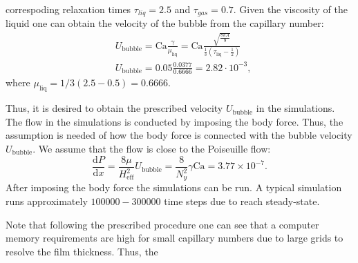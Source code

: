 \documentclass[preprint,12pt]{elsarticle}
\newcommand{\Ca}{\mathrm{Ca}}
\begin{document}
{\begin{description}
correspoding relaxation times $\tau_{liq}=2.5$ and $\tau_{gas}=0.7$. Given the viscosity of the
liquid one can obtain the velocity of the bubble from the capillary number: 
\begin{equation}
\begin{aligned}
&U_{\mathrm{bubble}}=\Ca \frac{\gamma}{\mu_{\mathrm{liq}}}=\Ca \frac{\sqrt{\frac{8 k
A}{9}}}{\frac{1}{3}(\tau_{\mathrm{liq}}-\frac{1}{2})}\\
&U_{\mathrm{bubble}}=0.05 \frac{0.0377}{0.6666}=2.82 \cdot10^{-3},
\end{aligned}
\end{equation}
where $\mu_{\mathrm{liq}}=1/3 (2.5-0.5)=0.6666$.
\item[Body force] 
Thus, it is desired to obtain the prescribed velocity $U_{\mathrm{bubble}}$ in the simulations. The
flow in the simulations is conducted by imposing the body force. Thus, the assumption is needed of
how the body force is connected with the bubble velocity $U_{\mathrm{bubble}}$. We assume that the
flow is close to the Poiseuille flow:
\begin{equation}
\frac{\mathrm{d}P}{\mathrm{d}x}=\frac{8\mu}{H_{\mathrm{eff}}^2}
U_{\mathrm{bubble}}=\frac{8}{N_y^2}\gamma \Ca=3.77\times 10^{-7}.  
\end{equation}
After imposing the body force the simulations can be run. A typical simulation runs approximately
$100000-300000$ time steps due to reach steady-state.
\end{description}
}
Note that following the prescribed procedure one can see that a computer memory requirements are
high for small capillary numbers due to large grids to resolve the film thickness. Thus, the
\end{document}
